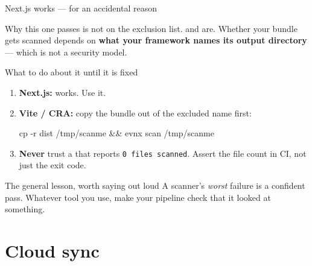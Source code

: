 \documentclass[aspectratio=169,10pt]{beamer}
\begin{document}
\begin{frame}[fragile]{Next.js works --- for an accidental reason}

  \vspace{0.4em}
  \begin{block}{Why this one passes}
     is not on the exclusion list.  and 
    are. Whether your bundle gets scanned depends on \textbf{what your
    framework names its output directory} --- which is not a security model.
  \end{block}
\end{frame}

\begin{frame}{What to do about it until it is fixed}
  \small
  \begin{enumerate}
    \item \textbf{Next.js:}  works. Use it.
    \item \textbf{Vite / CRA:} copy the bundle out of the excluded name first:
      \vspace{0.3em}
      \begin{center}\ttfamily\small
      cp -r dist /tmp/scanme \&\& evnx scan /tmp/scanme
      \end{center}
      \vspace{0.3em}
    \item \textbf{Never} trust a  that reports
      \texttt{0 files scanned}. Assert the file count in CI, not just the
      exit code.
  \end{enumerate}

  \vspace{0.8em}
  \begin{block}{The general lesson, worth saying out loud}
    A scanner's \emph{worst} failure is a confident pass. Whatever tool you
    use, make your pipeline check that it looked at something.
  \end{block}
\end{frame}

\section{Cloud sync}
\end{document}
